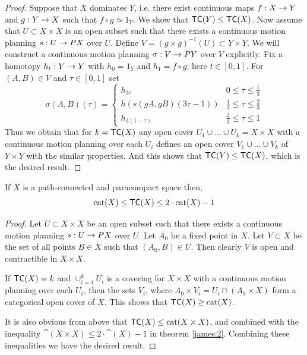 \begin{proof}
    Suppose that $X$ dominates $Y$, i.e. there exist continuous maps $f: X \rightarrow Y$ and $g: Y \rightarrow X$ such that $f \circ g \simeq 1_Y$. We show that $\textsf{TC}(Y) \le \textsf{TC}(X)$. Now assume that $U \subset X \times X$ is an open subset such that there exists a continuous motion planning $s : U \rightarrow PX$ over $U$. Define $V = (g \times g)^{-1}(U) \subset Y \times Y$. We will construct a continuous motion planning $\sigma: V \rightarrow PY$ over $V$ explicitly. Fix a homotopy $h_t: Y \rightarrow Y$ with $h_0 = 1_Y$ and $h_1 = f \circ g$; here $t \in [0,1]$. For $(A,B) \in V$ and $\tau \in [0,1]$ set
    \[
        \sigma(A,B)(\tau) = \begin{cases}
            h_{3\tau}               & 0 \le \tau \le \frac13       \\
            h(s(gA, gB)(3\tau - 1)) & \frac13 \le \tau \le \frac23 \\
            h_{3(1 - \tau)}         & \frac23 \le \tau \le 1
        \end{cases}
    \]
    Thus we obtain that for $k = \textsf{TC}(X)$ any open cover $U_1 \cup \ldots \cup U_k = X \times X$ with a continuous motion planning over each $U_i$ defines an open cover $V_1 \cup \ldots \cup V_k$ of $Y \times Y$ with the similar properties. And this shows that $\textsf{TC}(Y) \le \textsf{TC}(X)$, which is the desired result.
\end{proof}

\begin{thm}\label{upper:bound:lemma}
    If $X$ is a path-connected and paracompact space then,
    \[
        \operatorname{cat}(X) \le \textsf{TC}(X) \le 2 \cdot \operatorname{cat}(X) - 1
    \]
\end{thm}

\begin{proof}
    Let $U \subset X \times X$ be an open subset such that there exists a continuous motion planning $s: U \rightarrow PX$ over $U$. Let $A_0$ be a fixed point in $X$. Let $V \subset X$ be the set of all points $B \in X$ such that $(A_0, B) \in U$. Then clearly $V$ is open and contractible in $X \times X$.

    If $\textsf{TC}(X) = k$ and $\cup_{i=1}^{k}U_i$ is a covering for $X \times X$ with a continuous motion planning over each $U_i$, then the sets $V_i$, where $A_0 \times V_i = U_i \cap (A_0 \times X)$ form a categorical open cover of $X$. This shows that $\textsf{TC}(X) \ge \operatorname{cat}(X)$.

    It is also obvious from above that $\textsf{TC}(X) \le \operatorname{cat}(X \times X)$, and combined with the inequality $\cat(X \times X) \le 2 \cdot \cat(X) - 1$ in theorem \ref{james:2}. Combining these inequalities we have the desired result.
\end{proof}


